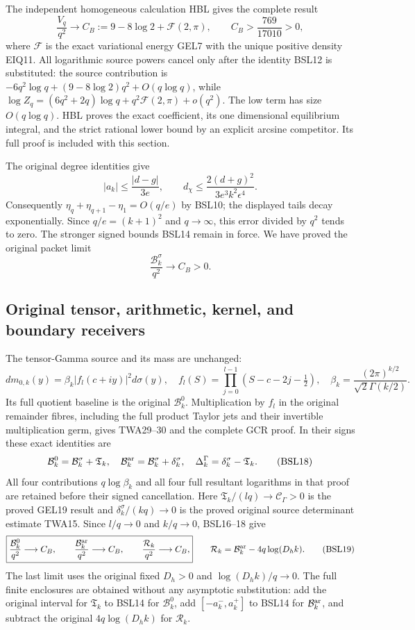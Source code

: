 \documentclass[11pt,a4paper]{article}
\begin{document}
The independent homogeneous calculation HBL gives the complete result
\[
 \frac{V_q}{q^2}\longrightarrow C_B
 :=9-8\log2+\mathcal F(2,\pi),\qquad
 C_B>\frac{769}{17010}>0,
 \tag{BSL15}
\]
where $\mathcal F$ is the exact variational energy GEL7 with the
unique positive density EIQ11. All logarithmic source powers cancel
only after the identity BSL12 is substituted: the source contribution
is $-6q^2\log q+(9-8\log2)q^2+O(q\log q)$, while
$\log Z_q=(6q^2+2q)\log q+q^2\mathcal F(2,\pi)+o(q^2)$.
The low term has size $O(q\log q)$. HBL proves the exact coefficient,
its one dimensional equilibrium integral, and the strict rational
lower bound by an explicit arcsine competitor. Its full proof is
included with this section.

The original degree identities give
\[
 |a_k|\leq\frac{|d-g|}{3e},\qquad
 d_\chi\leq\frac{2(d+g)^2}{3e^3k^2\epsilon^4}.
\]
Consequently $\eta_q+\eta_{q+1}-\eta_1=O(q/e)$ by BSL10;
the displayed tails decay exponentially. Since $q/e=(k+1)^2$
and $q\to\infty$, this error divided by $q^2$ tends to zero.
The stronger signed bounds BSL14 remain in force. We have proved
the original packet limit
\[
 \boxed{\frac{\mathcal B_k^\sigma}{q^2}\longrightarrow C_B>0.}
 \tag{BSL16}
\]

\subsection{Original tensor, arithmetic, kernel, and boundary receivers}
The tensor-Gamma source and its mass are unchanged:
\[
 dm_{0,k}(y)=\beta_k|f_l(c+iy)|^2d\sigma(y),\quad
 f_l(S)=\prod_{j=0}^{l-1}(S-c-2j-\tfrac12),\quad
 \beta_k=\frac{(2\pi)^{k/2}}{\sqrt2\Gamma(k/2)}.
 \tag{BSL17}
\]
Its full quotient baseline is the original $\mathcal B_k^0$.
Multiplication by $f_l$ in the original remainder fibres, including
the full product Taylor jets and their invertible multiplication germ,
gives TWA29--30 and the complete GCR proof. In their signs these exact
identities are
\[
 \mathcal B_k^0=\mathcal B_k^\sigma+\mathfrak T_k,
 \quad\mathcal B_k^{\rm ar}=\mathcal B_k^\sigma+\delta_k^\sigma,
 \quad\Delta_k^\Gamma=\delta_k^\sigma-\mathfrak T_k.
 \tag{BSL18}
\]
All four contributions $q\log\beta_k$ and all four full resultant
logarithms in that proof are retained before their signed cancellation.
Here $\mathfrak T_k/(lq)\to\mathcal C_\Gamma>0$ is the proved
GEL19 result and $\delta_k^\sigma/(kq)\to0$ is the proved original
source determinant estimate TWA15. Since $l/q\to0$ and $k/q\to0$,
BSL16--18 give
\[
 \boxed{\frac{\mathcal B_k^0}{q^2}\longrightarrow C_B,\qquad
 \frac{\mathcal B_k^{\rm ar}}{q^2}\longrightarrow C_B,\qquad
 \frac{\mathcal R_k}{q^2}\longrightarrow C_B,}
 \qquad\mathcal R_k=\mathcal B_k^{\rm ar}-4q\log(D_hk).
 \tag{BSL19}
\]
The last limit uses the original fixed $D_h>0$ and
$\log(D_hk)/q\to0$. The full finite enclosures are obtained without
any asymptotic substitution: add the original interval for
$\mathfrak T_k$ to BSL14 for $\mathcal B_k^0$, add
$[-a_k^-,a_k^+]$ to BSL14 for $\mathcal B_k^{\rm ar}$, and subtract
the original $4q\log(D_hk)$ for $\mathcal R_k$.
\end{document}
